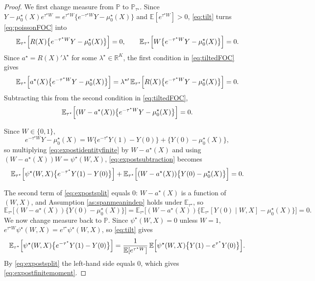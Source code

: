 \documentclass[11pt]{article}
\theoremstyle{definition}
\theoremstyle{plain}
\newcommand{\E}{\mathbb{E}}
\newcommand{\1}{\mathbf{1}}
\newcommand{\R}{\mathbb{R}}
\begin{document}
\begin{proof}
We first change measure from $\mathbb P$ to $\mathbb P_{\tau^\star}$.  Since $Y-\mu_0^\star(X)e^{\tau^\star W}=e^{\tau^\star W}\bigl\{e^{-\tau^\star W}Y-\mu_0^\star(X)\bigr\}$ and $\E[e^{\tau^\star W}]>0$, \eqref{eq:tilt} turns \eqref{eq:poissonFOC} into
\begin{equation}
\E_{\tau^\star}\Bigl[R(X)\bigl\{e^{-\tau^\star W}Y-\mu_0^\star(X)\bigr\}\Bigr]=0,
\qquad
\E_{\tau^\star}\Bigl[W\bigl\{e^{-\tau^\star W}Y-\mu_0^\star(X)\bigr\}\Bigr]=0 .
\label{eq:tiltedFOC}
\end{equation}
Since $a^\star=R(X)'\lambda^\star$ for some $\lambda^\star\in\R^K$, the first condition in \eqref{eq:tiltedFOC} gives
\[
\E_{\tau^\star}\Bigl[a^\star(X)\bigl\{e^{-\tau^\star W}Y-\mu_0^\star(X)\bigr\}\Bigr]
=\lambda^{\star\prime}\,\E_{\tau^\star}\Bigl[R(X)\bigl\{e^{-\tau^\star W}Y-\mu_0^\star(X)\bigr\}\Bigr]=0 .
\]
Subtracting this from the second condition in \eqref{eq:tiltedFOC},
\begin{equation}
\E_{\tau^\star}\Bigl[(W-a^\star(X))\bigl\{e^{-\tau^\star W}Y-\mu_0^\star(X)\bigr\}\Bigr]=0 .
\label{eq:expostsubtraction}
\end{equation}

Since $W\in\{0,1\}$,
\begin{equation}
e^{-\tau^\star W}Y-\mu_0^\star(X)
=
W\bigl\{e^{-\tau^\star}Y(1)-Y(0)\bigr\}+\bigl\{Y(0)-\mu_0^\star(X)\bigr\},
\label{eq:expostidentityfinite}
\end{equation}
so multiplying \eqref{eq:expostidentityfinite} by $W-a^\star(X)$ and using $(W-a^\star(X))W=\psi^\star(W,X)$, \eqref{eq:expostsubtraction} becomes
\begin{equation}
\E_{\tau^\star}\Bigl[\psi^\star(W,X)\bigl\{e^{-\tau^\star}Y(1)-Y(0)\bigr\}\Bigr]
+\E_{\tau^\star}\Bigl[(W-a^\star(X))\bigl\{Y(0)-\mu_0^\star(X)\bigr\}\Bigr]=0 .
\label{eq:expostsplit}
\end{equation}

The second term of \eqref{eq:expostsplit} equals 0: $W-a^\star(X)$ is a function of $(W,X)$, and Assumption \ref{as:spanmeanindep} holds under $\E_{\tau^\star}$, so
\[
\E_{\tau^\star}\bigl[(W-a^\star(X))\{Y(0)-\mu_0^\star(X)\}\bigr]
=\E_{\tau^\star}\bigl[(W-a^\star(X))\{\E_{\tau^\star}[Y(0)\mid W,X]-\mu_0^\star(X)\}\bigr]=0 .
\]
We now change measure back to $\mathbb P$.  Since $\psi^\star(W,X)=0$ unless $W=1$, $e^{\tau^\star W}\psi^\star(W,X)=e^{\tau^\star}\psi^\star(W,X)$, so \eqref{eq:tilt} gives
\[
\E_{\tau^\star}\Bigl[\psi^\star(W,X)\bigl\{e^{-\tau^\star}Y(1)-Y(0)\bigr\}\Bigr]
=
\frac{1}{\E[e^{\tau^\star W}]}\,\E\Bigl[\psi^\star(W,X)\bigl\{Y(1)-e^{\tau^\star}Y(0)\bigr\}\Bigr] .
\]
By \eqref{eq:expostsplit} the left-hand side equals 0, which gives \eqref{eq:expostfinitemoment}.
\end{proof}
\end{document}
